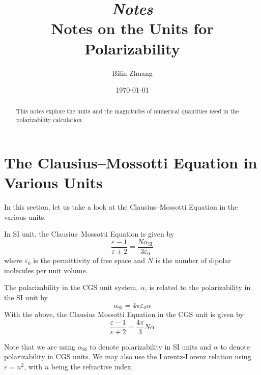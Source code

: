 \documentclass[aps, 12pt, amsmath, amssymb, onecolumn, notitlepage, nofootinbib]{revtex4-1}
\begin{document}

\title{{\small\it{Notes}}\\ Notes on the Units for Polarizability }
\author{Bilin Zhuang}
\date{\today}



\begin{abstract}

This notes explore the units and the magnitudes of numerical quantities used in the polarizability calculation.
	
\end{abstract}

\maketitle


\section{The Clausius--Mossotti Equation in Various Units}

In this section, let us take a look at the Clausius--Mossotti Equation in the various units.

In SI unit, the Clausius--Mossotti Equation is given by
\begin{equation}
\frac{\varepsilon-1}{\varepsilon+2} = \frac{N\alpha_\text{SI}}{3\varepsilon_0}
\end{equation}
where $\varepsilon_0$ is the permittivity of free space and $N$ is the number of dipolar molecules per unit volume.

The polarizability in the CGS unit system, $\alpha$, is related to the polarizability in the SI unit by
\begin{equation}
\alpha_\text{SI} = 4\pi\varepsilon_0 \alpha
\end{equation}
With the above, the Clausius Mossotti Equation in the CGS unit is given by
\begin{equation}
\frac{\varepsilon-1}{\varepsilon+2} = \frac{4 \pi}{3} N \alpha
\end{equation}

Note that we are using $\alpha_\text{SI}$ to denote polarizability in SI units and $\alpha$ to denote polarizability in CGS units. We may also use the Lorentz-Lorenz relation using $\varepsilon = n^2$, with $n$ being the refractive index. 

 
\end{document}
